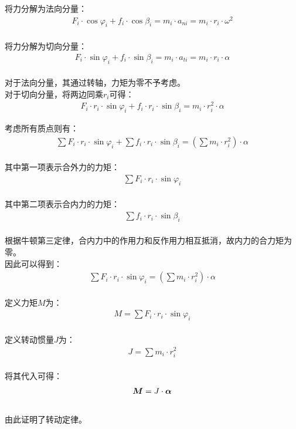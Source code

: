 \documentclass[UTF8]{ctexart}
\newcommand*{\veb}[1]{\vb*{#1}}
\begin{document}
    将力分解为法向分量：
    \begin{align}
        F_i\cdot\cos\varphi_i+f_i\cdot\cos\beta_i=m_i\cdot a_{ni}=m_i\cdot r_i\cdot\omega^2
    \end{align}\\
    将力分解为切向分量：
    \begin{align}
        F_i\cdot\sin\varphi_i+f_i\cdot\sin\beta_i=m_i\cdot a_{ti}=m_i\cdot r_i\cdot\alpha
    \end{align}\\
    对于法向分量，其通过转轴，力矩为零不予考虑。\\[3mm]
    对于切向分量，将两边同乘$r_i$可得：
    \begin{align}
        F_i\cdot r_i\cdot\sin\varphi_i+f_i\cdot r_i\cdot\sin\beta_i=m_i\cdot r_i^2\cdot\alpha
    \end{align}

\newpage

    考虑所有质点则有：
    \begin{align}
        \sum F_i\cdot r_i\cdot\sin\varphi_i+\sum f_i\cdot r_i\cdot\sin\beta_i=\left(\sum m_i\cdot r_i^2\right)\cdot\alpha
    \end{align}\\
    其中第一项表示合外力的力矩：
    \begin{align}
        \sum F_i\cdot r_i\cdot\sin\varphi_i
    \end{align}\\
    其中第二项表示合内力的力矩：
    \begin{align}
        \sum f_i\cdot r_i\cdot\sin\beta_i
    \end{align}\\
    根据牛顿第三定律，合内力中的作用力和反作用力相互抵消，故内力的合力矩为零。\\[16mm]
    因此可以得到：
    \begin{align}
        \sum F_i\cdot r_i\cdot\sin\varphi_i=\left(\sum m_i\cdot r_i^2\right)\cdot\alpha
    \end{align}\\
    定义力矩$M$为：
    \begin{align}
        M=\sum F_i\cdot r_i\cdot\sin\varphi_i
    \end{align}\\
    定义转动惯量$J$为：
    \begin{align}
        J=\sum m_i\cdot r_i^2
    \end{align}\\
    将其代入可得：
    \begin{align}
        \veb{M}=J\cdot\veb{\alpha}
    \end{align}\\
    由此证明了转动定律。
\end{document}
